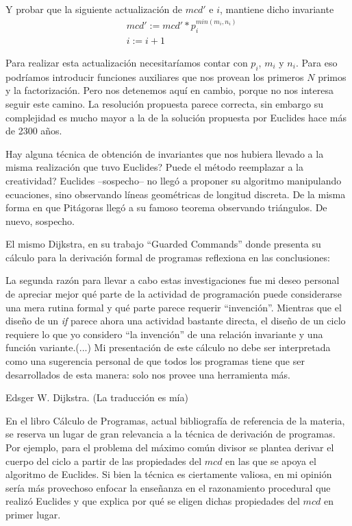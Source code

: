 \documentclass[12pt, a4paper, openany, fleqn]{book}
\begin{document}
    Y probar que la siguiente actualización de $mcd'$ e $i$, mantiene dicho invariante
    \begin{align*}
        & mcd' := mcd' * p_{i}^{min(m_{i}, n_{i})} \\
        & i := i + 1
    \end{align*}

    Para realizar esta actualización necesitaríamos contar con $p_{i}$, $m_{i}$ y $n_{i}$. Para eso podríamos introducir funciones auxiliares que nos provean los primeros $N$ primos y la factorización. Pero nos detenemos aquí en cambio, porque no nos interesa seguir este camino. La resolución propuesta parece correcta, sin embargo su complejidad es mucho mayor a la de la solución propuesta por Euclides hace más de 2300 años.

    Hay alguna técnica de obtención de invariantes que nos hubiera llevado a la misma realización que tuvo Euclides? Puede el método reemplazar a la creatividad?
    Euclides --sospecho-- no llegó a proponer su algoritmo manipulando ecuaciones, sino observando líneas geométricas de longitud discreta. De la misma forma en que Pitágoras llegó a su famoso teorema observando triángulos. De nuevo, sospecho.

    El mismo Dijkstra, en su trabajo ``Guarded Commands''\cite{EWD:EWD418} donde presenta su cálculo para la derivación formal de programas reflexiona en las conclusiones:

    \vspace{1em}
    \begin{quoting}
        La segunda razón para llevar a cabo estas investigaciones fue mi deseo personal de apreciar mejor qué parte de la actividad de programación puede considerarse una mera rutina formal y qué parte parece requerir ``invención''. Mientras que el diseño de un \textit{if} parece ahora una actividad bastante directa, el diseño de un ciclo requiere lo que yo considero ``la invención'' de una relación invariante y una función variante.(...) Mi presentación de este cálculo no debe ser interpretada como una sugerencia personal de que todos los programas tiene que ser desarrollados de esta manera: solo nos provee una herramienta más.
    \end{quoting} Edsger W. Dijkstra. (La traducción es mía)
    \vspace{1em}

    En el libro Cálculo de Programas, actual bibliografía de referencia de la materia, se reserva un lugar de gran relevancia a la técnica de derivación de programas. Por ejemplo, para el problema del máximo común divisor se plantea derivar el cuerpo del ciclo a partir de las propiedades del $mcd$ en las que se apoya el algoritmo de Euclides.
    Si bien la técnica es ciertamente valiosa, en mi opinión sería más provechoso enfocar la enseñanza en el razonamiento procedural que realizó Euclides y que explica por qué se eligen dichas propiedades del $mcd$ en primer lugar.
\end{document}
